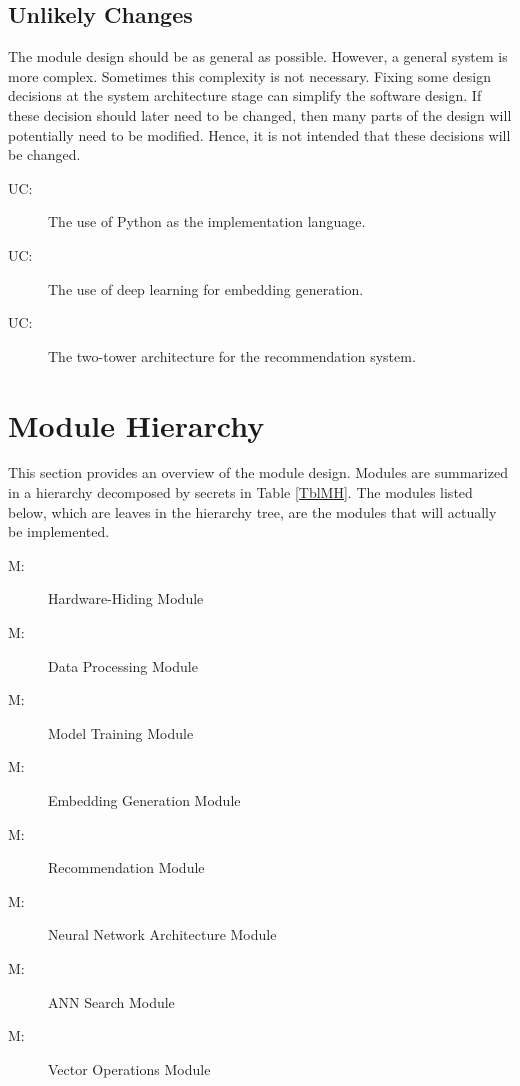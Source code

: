 \documentclass[12pt, titlepage]{article}
\newcounter{ucnum}
\newcommand{\uctheucnum}{UC\theucnum}
\newcounter{mnum}
\newcommand{\mthemnum}{M\themnum}
\begin{document}
\subsection{Unlikely Changes} \label{SecUchange}

The module design should be as general as possible. However, a general system is
more complex. Sometimes this complexity is not necessary. Fixing some design
decisions at the system architecture stage can simplify the software design. If
these decision should later need to be changed, then many parts of the design
will potentially need to be modified. Hence, it is not intended that these
decisions will be changed.

\begin{description}
\item[ \uctheucnum \label{ucImplementation}:] The use of Python as the implementation language.
\item[ \uctheucnum \label{ucDeepLearning}:] The use of deep learning for embedding generation.
\item[ \uctheucnum \label{ucTTE}:] The two-tower architecture for the recommendation system.
\end{description}

\section{Module Hierarchy} \label{SecMH}

This section provides an overview of the module design. Modules are summarized
in a hierarchy decomposed by secrets in Table \ref{TblMH}. The modules listed
below, which are leaves in the hierarchy tree, are the modules that will
actually be implemented.

\begin{description}
\item [ \mthemnum \label{mHH}:] Hardware-Hiding Module
\item [ \mthemnum \label{mDP}:] Data Processing Module
\item [ \mthemnum \label{mMT}:] Model Training Module
\item [ \mthemnum \label{mEG}:] Embedding Generation Module
\item [ \mthemnum \label{mRe}:] Recommendation Module
\item [ \mthemnum \label{mNN}:] Neural Network Architecture Module
\item [ \mthemnum \label{mANN}:] ANN Search Module
\item [ \mthemnum \label{mVO}:] Vector Operations Module
\end{description}
\end{document}
